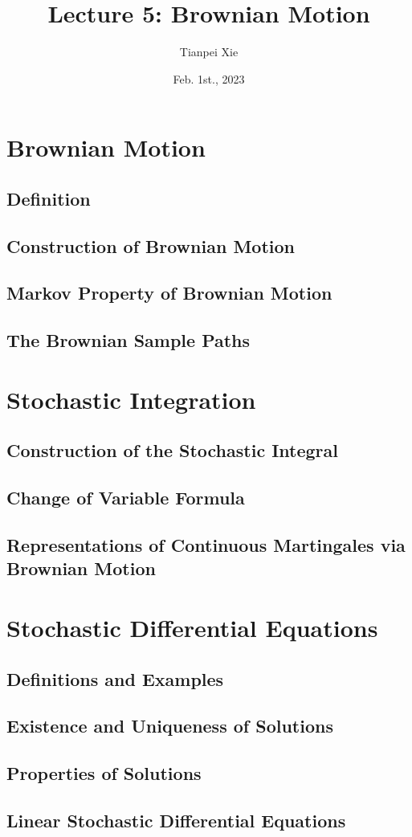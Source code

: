 \documentclass[11pt]{article}
\begin{document}
\title{Lecture 5: Brownian Motion}
\author{ Tianpei Xie}
\date{Feb. 1st., 2023}
\maketitle
\tableofcontents
\newpage
\section{Brownian Motion}
\subsection{Definition}
\subsection{Construction of Brownian Motion}
\subsection{Markov Property of Brownian Motion}
\subsection{The Brownian Sample Paths}

\section{Stochastic Integration}
\subsection{Construction of the Stochastic Integral}
\subsection{Change of Variable Formula}
\subsection{Representations of Continuous Martingales via Brownian Motion}

\section{Stochastic Differential Equations}
\subsection{Definitions and Examples}
\subsection{Existence and Uniqueness of Solutions}
\subsection{Properties of Solutions}
\subsection{Linear Stochastic Differential Equations}
\newpage


\end{document}
